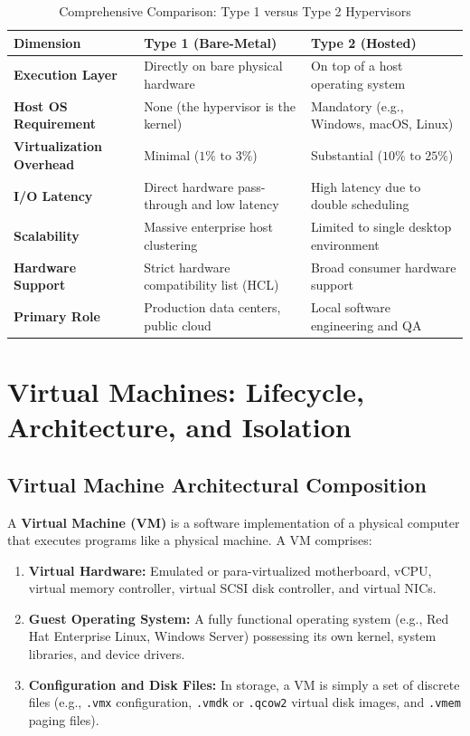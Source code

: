 \begin{table}[htbp]
\centering
\small
\caption{Comprehensive Comparison: Type 1 versus Type 2 Hypervisors}
\label{tab:hypervisor_comparison}
\begin{tabularx}{\textwidth}{p{3.5cm}XX}
\toprule
\textbf{Dimension} & \textbf{Type 1 (Bare-Metal)} & \textbf{Type 2 (Hosted)} \\
\midrule
\textbf{Execution Layer} & Directly on bare physical hardware & On top of a host operating system \\
\textbf{Host OS Requirement} & None (the hypervisor is the kernel) & Mandatory (e.g., Windows, macOS, Linux) \\
\textbf{Virtualization Overhead} & Minimal ($1\%\text{ to }3\%$) & Substantial ($10\%\text{ to }25\%$) \\
\textbf{I/O Latency} & Direct hardware pass-through and low latency & High latency due to double scheduling \\
\textbf{Scalability} & Massive enterprise host clustering & Limited to single desktop environment \\
\textbf{Hardware Support} & Strict hardware compatibility list (HCL) & Broad consumer hardware support \\
\textbf{Primary Role} & Production data centers, public cloud & Local software engineering and QA \\
\bottomrule
\end{tabularx}
\end{table}


\section{Virtual Machines: Lifecycle, Architecture, and Isolation}
\label{sec:virtual_machines}

\subsection{Virtual Machine Architectural Composition}
A \textbf{Virtual Machine (VM)} is a software implementation of a physical computer that executes programs like a physical machine. A VM comprises:
\begin{enumerate}
    \item \textbf{Virtual Hardware:} Emulated or para-virtualized motherboard, vCPU, virtual memory controller, virtual SCSI disk controller, and virtual NICs.
    \item \textbf{Guest Operating System:} A fully functional operating system (e.g., Red Hat Enterprise Linux, Windows Server) possessing its own kernel, system libraries, and device drivers.
    \item \textbf{Configuration and Disk Files:} In storage, a VM is simply a set of discrete files (e.g., \texttt{.vmx} configuration, \texttt{.vmdk} or \texttt{.qcow2} virtual disk images, and \texttt{.vmem} paging files).
\end{enumerate}


